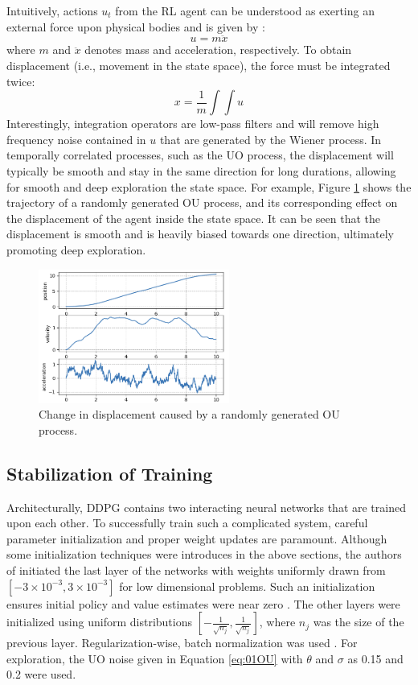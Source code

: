 Intuitively, actions $u_t$ from the RL agent can be understood as exerting an external force upon physical bodies and is given by \cite{physics}:
\begin{equation}
    u = m \ddot{x}
\end{equation}
where $m$ and  $\ddot{x}$ denotes mass and acceleration, respectively.  To obtain displacement (i.e., movement in the state space), the force must be integrated twice:
\begin{equation}
    x = \frac{1}{m}\int \int u
\end{equation}
Interestingly, integration operators are low-pass filters \cite{process_control_ref13} and will remove high frequency noise contained in $u$ that are generated by the Wiener process. In temporally correlated processes, such as the UO process, the displacement will typically be smooth and stay in the same direction for long durations, allowing for smooth and deep exploration the state space. For example, Figure \ref{fig:01OU} shows the trajectory of a randomly generated OU process, and its corresponding effect on the displacement of the agent inside the state space.  It can be seen that the displacement is smooth and is heavily biased towards one direction, ultimately promoting deep exploration.

\begin{figure}[H]
    \centering
    \includegraphics[width=0.56\textwidth]{images/ch1/01OU.jpeg}
    \caption{Change in displacement caused by a randomly generated OU process.}
    \label{fig:01OU}
\end{figure}   


\subsection{Stabilization of Training}
Architecturally, DDPG contains two interacting neural networks that are trained upon each other.  To successfully train such a complicated system, careful parameter initialization and proper weight updates are paramount.  Although some initialization techniques were introduces in the above sections, the authors of \cite{ddpg} initiated the last layer of the networks with weights uniformly drawn from $[-3 \times 10^{-3}, 3 \times 10^{-3}]$ for low dimensional problems. Such an initialization ensures initial policy and value estimates were near zero \cite{ddpg}. The other layers were initialized using uniform distributions $[-\frac{1}{\sqrt{n_j}}, \frac{1}{\sqrt{n_j}}]$, where $n_j$ was the size of the previous layer.  Regularization-wise, batch normalization was used \cite{batch_norm}. For exploration, the UO noise given in Equation \ref{eq:01OU} with $\theta$ and $\sigma$ as 0.15 and 0.2 were used.

